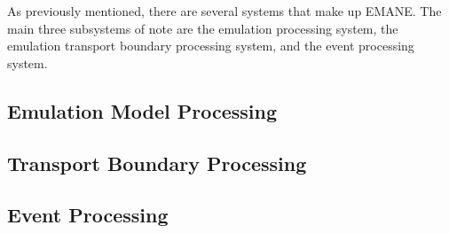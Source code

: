 
As previously mentioned, there are several systems that make up EMANE.
The main three subsystems of note are the emulation processing system, the emulation transport boundary processing system, and the event processing system.

\subsection{Emulation Model Processing}

\subsection{Transport Boundary Processing}

\subsection{Event Processing}


